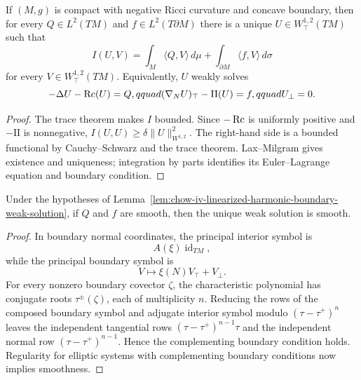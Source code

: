 \begin{lemma}
\label{lem:chow-iv-linearized-harmonic-boundary-weak-solution}

If \((M,g)\) is compact with negative Ricci curvature and concave boundary,
then for every \(Q\in L^2(TM)\) and \(f\in L^2(T\partial M)\) there is a unique
\(U\in W^{1,2}_{\top}(TM)\) such that
\[
 I(U,V)=\int_M\langle Q,V\rangle\,d\mu
       +\int_{\partial M}\langle f,V\rangle\,d\sigma
\]
for every \(V\in W^{1,2}_{\top}(TM)\).  Equivalently, \(U\) weakly solves
\[
 -\Delta U-\operatorname{Rc}(U)=Q,qquad
 (\nabla_NU)_{\top}-\mathrm{II}(U)=f,qquad U_\perp=0.
\]
\end{lemma}
\begin{proof}
\sketch
The trace theorem makes \(I\) bounded.  Since \(-\operatorname{Rc}\) is uniformly positive
and \(-\mathrm{II}\) is nonnegative, \(I(U,U)\ge\delta\|U\|_{W^{1,2}}^2\).
The right-hand side is a bounded functional by Cauchy--Schwarz and the trace
theorem.  Lax--Milgram gives existence and uniqueness; integration by parts
identifies its Euler--Lagrange equation and boundary condition.
\end{proof}

\begin{lemma}
\label{lem:chow-iv-linearized-harmonic-boundary-regularity}


Under the hypotheses of Lemma~\ref{lem:chow-iv-linearized-harmonic-boundary-weak-solution},
if \(Q\) and \(f\) are smooth, then the unique weak solution is smooth.
\end{lemma}
\begin{proof}
\sketch
In boundary normal coordinates, the principal interior symbol is
\[
 A(\xi)\operatorname{id}_{TM},
\]
while the principal boundary symbol is
\[
 V\longmapsto \xi(N)V_{\top}+V_\perp.
\]
For every nonzero boundary covector \(\zeta\), the characteristic polynomial
has conjugate roots \(\tau^\pm(\zeta)\), each of multiplicity \(n\).  Reducing
the rows of the composed boundary symbol and adjugate interior symbol modulo
\((\tau-\tau^+)^n\) leaves the independent tangential rows
\((\tau-\tau^+)^{n-1}\tau\) and the independent normal row
\((\tau-\tau^+)^{n-1}\).  Hence the complementing boundary condition holds.
Regularity for elliptic systems with complementing boundary conditions now
implies smoothness.
\end{proof}

